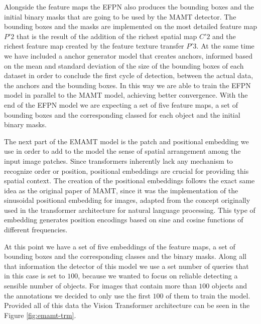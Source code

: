 Alongside the feature maps the EFPN also produces the bounding boxes and the initial binary masks that are going to be used by the MAMT detector. The 
bounding boxes and the masks are implemented on the most detailed feature map $P'2$ that is the result of the addition of the richest spatial map $C'2$ 
and the richest feature map created by the feature texture transfer $P'3$. At the same time we have included a anchor generator model that creates anchors, 
informed based on the mean and standard deviation of the size of the bounding boxes of each dataset in order to conclude the first cycle of detection, between the 
actual data, the anchors and the bounding boxes. In this way we are able to train the EFPN model in parallel to the MAMT model, achieving better convergence.
With the end of the EFPN model we are expecting a set of five  feature maps, a set of bounding boxes and the corresponding classed for each object 
and the initial binary masks. 

The next part of the EMAMT model is the patch and positional embedding we use in order to add to the model the  sense of spatial arrangement among the input 
image patches. Since transformers inherently lack any mechanism to recognize order or position, positional embeddings are crucial for providing this spatial 
context. The creation of the positional embeddings follows the exact same idea as the original paper of MAMT, since it was the implementation of the
sinusoidal positional embedding for images, adapted from the concept originally used in the transformer architecture for natural language processing.
This type of embedding generates position encodings based on sine and cosine functions of different frequencies.


At this point we have a set of five embeddings of the feature maps, a set of bounding boxes and the corresponding classes and the binary masks. Along all
that information the detector of this model we use a set number of queries that in this case is set to $100$, because we wanted to focus on reliable 
detecting a sensible number of objects. For images that contain more than $100$ objects and the annotations we decided to only use the first $100$ of them 
to train the model. Provided all of this data the Vision Transformer architecture can be seen in the Figure \ref{fig:emamt-trm}.

